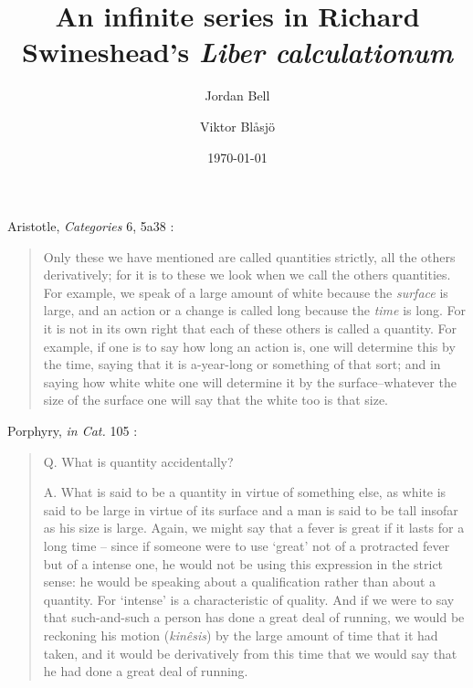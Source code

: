 \documentclass{amsart}
\theoremstyle{definition}
\begin{document}
\title[Swineshead's {\em Liber calculationum}]{An infinite series in Richard Swineshead's {\em Liber calculationum}}
\author{Jordan Bell}
\address{Department of Mathematics, University of Toronto, Toronto, Ontario, Canada}
\author{Viktor Bl{\aa}sj{\"o}}
\address{Mathematisch Instituut, Universiteit Utrecht, Utrecht, The Netherlands}
\date{\today}

\maketitle

Aristotle, {\em Categories} 6, 5a38 \cite[p.~12]{ackrill}:

\begin{quote}
Only these we have mentioned are called quantities
strictly, all the others derivatively; for it is to these we
look when we call the others quantities. For example, we
speak of a large amount of white because the {\em surface} is
large, and an action or a change is called long because
the {\em time} is long. For it is not in its own right that each of
these others is called a quantity. For example, if one is to
say how long an action is, one will determine this by the
time, saying that it is a-year-long or something of that sort;
and in saying how white white one will determine it by
the surface--whatever the size of the surface one will say
that the white too is that size. 
\end{quote}

Porphyry, {\em in Cat.} 105 \cite[pp.~102--103]{strange}:

\begin{quote}
Q. What is quantity accidentally?

A. What is said to be a quantity in virtue of something else,
as white is said to be large in virtue of its surface and a man is
said to be tall insofar as his size is large. Again, we might say
that a fever is great if it lasts for a long time -- since if someone were to use `great' not of a protracted fever but of a intense
one, he would not be using this expression in the strict sense:
he would be speaking about a qualification rather than about
a quantity. For `intense' is a characteristic of quality. And if
we were to say that such-and-such a person has done a great
deal of running, we would be reckoning his motion ({\em kin\^{e}sis}) by 
the large amount of time that it had taken, and it would be derivatively from this time that we would say that he had
done a great deal of running.
\end{quote}
\end{document}
